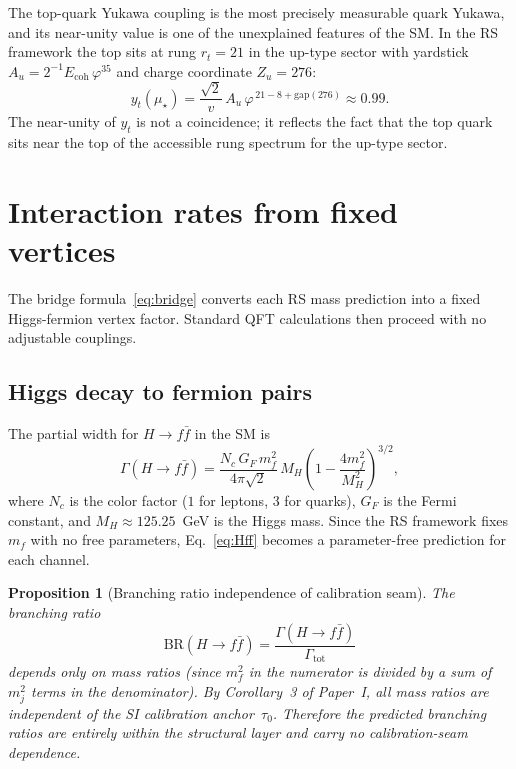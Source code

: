 \documentclass[11pt]{article}
\newtheorem{proposition}[theorem]{Proposition}
\theoremstyle{remark}
\newcommand{\phig}{\varphi}
\newcommand{\mustar}{\mu_\star}
\newcommand{\Ecoh}{E_{\mathrm{coh}}}
\begin{document}
The top-quark Yukawa coupling is the most precisely measurable
quark Yukawa, and its near-unity value is one of the unexplained
features of the SM.  In the RS framework the top sits at rung
$r_t = 21$ in the up-type sector with yardstick
$A_u = 2^{-1}\Ecoh\,\phig^{35}$ and charge coordinate
$Z_u = 276$:
\begin{equation}\label{eq:yt}
  y_t(\mustar)
  = \frac{\sqrt{2}}{v}\,
    A_u\,\phig^{\,21 - 8 + \mathrm{gap}(276)}
  \approx 0.99.
\end{equation}
The near-unity of $y_t$ is not a coincidence; it reflects the
fact that the top quark sits near the top of the accessible
rung spectrum for the up-type sector.

\section{Interaction rates from fixed vertices}
\label{sec:rates}

The bridge formula~\eqref{eq:bridge} converts each RS mass
prediction into a fixed Higgs-fermion vertex factor.  Standard
QFT calculations then proceed with no adjustable couplings.

\subsection{Higgs decay to fermion pairs}

The partial width for $H\to f\bar{f}$ in the SM is
\begin{equation}\label{eq:Hff}
  \Gamma(H\to f\bar{f})
  = \frac{N_c\,G_F\,m_f^2}{4\pi\sqrt{2}}\,M_H
    \left(1-\frac{4m_f^2}{M_H^2}\right)^{\!3/2},
\end{equation}
where $N_c$ is the color factor ($1$ for leptons, $3$ for quarks),
$G_F$ is the Fermi constant, and $M_H\approx 125.25$~GeV is the
Higgs mass.  Since the RS framework fixes $m_f$ with no free
parameters, Eq.~\eqref{eq:Hff} becomes a parameter-free
prediction for each channel.

\begin{proposition}[Branching ratio independence of calibration seam]
The branching ratio
\[
  \mathrm{BR}(H\to f\bar{f})
  = \frac{\Gamma(H\to f\bar{f})}{\Gamma_{\mathrm{tot}}}
\]
depends only on mass \emph{ratios} (since $m_f^2$ in the
numerator is divided by a sum of $m_j^2$ terms in the
denominator).  By Corollary~3 of Paper~I, all mass ratios
are independent of the SI calibration anchor~$\tau_0$.
Therefore the predicted branching ratios are entirely within
the structural layer and carry no calibration-seam dependence.
\end{proposition}
\end{document}
